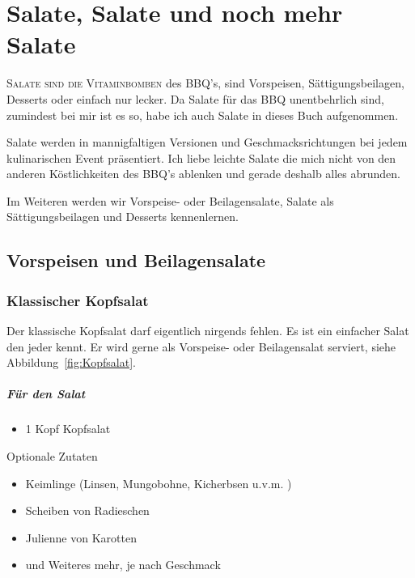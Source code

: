 \chapter{Salate, Salate und noch mehr Salate}\label{Chapter6}
\lettrine[lines=3]{S}{alate sind die Vitaminbomben} des BBQ's, sind  Vorspeisen, Sättigungsbeilagen, Desserts oder einfach nur lecker. Da 
Salate für das BBQ
unentbehrlich sind, zumindest bei mir ist es so, habe ich auch Salate in dieses Buch aufgenommen. 

Salate werden in mannigfaltigen Versionen und Geschmacksrichtungen bei jedem kulinarischen Event präsentiert. Ich liebe leichte Salate 
die mich nicht von
den anderen Köstlichkeiten des BBQ's ablenken und gerade deshalb alles abrunden.

Im Weiteren werden wir Vorspeise- oder Beilagensalate, Salate als Sättigungsbeilagen und Desserts kennenlernen. 

\section{ Vorspeisen und Beilagensalate}

\subsection{Klassischer Kopfsalat}

Der klassische Kopfsalat darf eigentlich nirgends fehlen. Es ist ein einfacher Salat den jeder kennt. Er wird gerne als Vorspeise- oder 
Beilagensalat serviert, siehe Abbildung~\vref{fig:Kopfsalat}. 


\paragraph{Für den Salat}

\begin{itemize}[noitemsep]
	\item 1 Kopf Kopfsalat
\end{itemize}

Optionale Zutaten

\begin{itemize}[noitemsep]
	\item Keimlinge (Linsen, Mungobohne, Kicherbsen u.v.m. )
	\item Scheiben von Radieschen
	\item Julienne von Karotten
	\item und Weiteres mehr, je nach Geschmack
\end{itemize}


